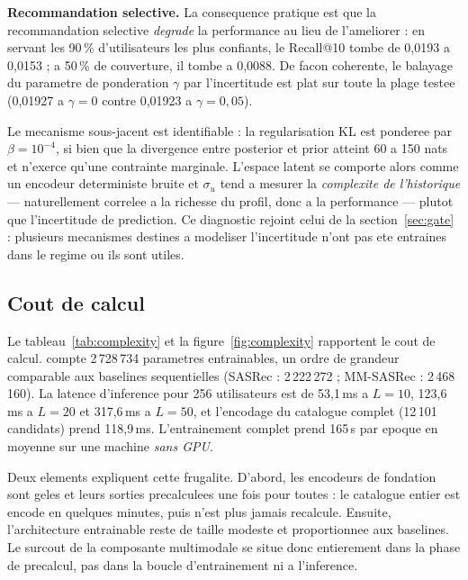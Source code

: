\textbf{Recommandation selective.} La consequence pratique est que la
recommandation selective \emph{degrade} la performance au lieu de l'ameliorer :
en servant les 90\,\% d'utilisateurs les plus confiants, le Recall@10 tombe de
0,0193 a 0,0153 ; a 50\,\% de couverture, il tombe a 0,0088. De facon
coherente, le balayage du parametre de ponderation $\gamma$ par l'incertitude
est plat sur toute la plage testee (0,01927 a $\gamma=0$ contre 0,01923 a
$\gamma=0{,}05$).

Le mecanisme sous-jacent est identifiable : la regularisation KL est ponderee
par $\beta = 10^{-4}$, si bien que la divergence entre posterior et prior atteint
60 a 150 nats et n'exerce qu'une contrainte marginale. L'espace latent se
comporte alors comme un encodeur deterministe bruite et $\sigma_u$ tend a
mesurer la \emph{complexite de l'historique} --- naturellement correlee a la
richesse du profil, donc a la performance --- plutot que l'incertitude de
prediction. Ce diagnostic rejoint celui de la section~\ref{sec:gate} : plusieurs
mecanismes destines a modeliser l'incertitude n'ont pas ete entraines dans le
regime ou ils sont utiles.

\subsection{Cout de calcul}
\label{sec:cost}

Le tableau~\ref{tab:complexity} et la figure~\ref{fig:complexity} rapportent le
cout de calcul. \model{} compte 2\,728\,734 parametres entrainables, un ordre de
grandeur comparable aux baselines sequentielles (SASRec : 2\,222\,272 ;
MM-SASRec : 2\,468\,160). La latence d'inference pour 256 utilisateurs est de
53,1\,ms a $L=10$, 123,6\,ms a $L=20$ et 317,6\,ms a $L=50$, et l'encodage du
catalogue complet (12\,101 candidats) prend 118,9\,ms. L'entrainement complet
prend 165\,s par epoque en moyenne sur une machine \emph{sans GPU}.

Deux elements expliquent cette frugalite. D'abord, les encodeurs de fondation
sont geles et leurs sorties precalculees une fois pour toutes : le catalogue
entier est encode en quelques minutes, puis n'est plus jamais recalcule.
Ensuite, l'architecture entrainable reste de taille modeste et
proportionnee aux baselines. Le surcout de la composante multimodale se situe
donc entierement dans la phase de precalcul, pas dans la boucle
d'entrainement ni a l'inference.

